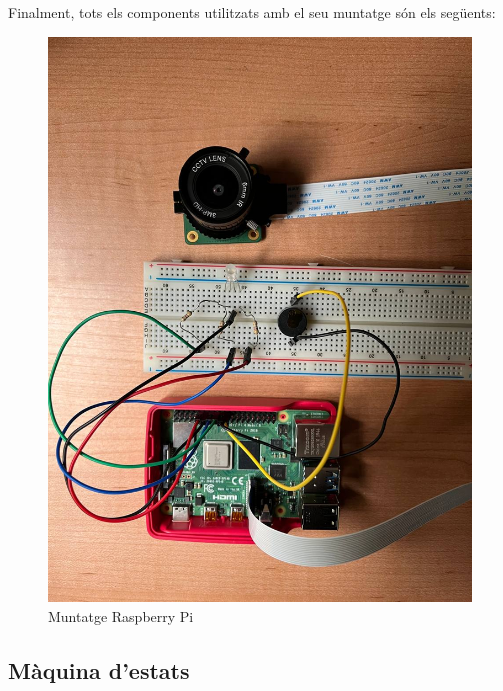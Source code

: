 Finalment, tots els components utilitzats amb el seu muntatge són els següents:

\begin{figure}[H]
    \begin{center}
        \includegraphics[scale=0.28]{Fotos/material.jpeg}
    \end{center}
    \caption{Muntatge Raspberry Pi}
    \label{fig:material}
\end{figure}


\subsection{Màquina d'estats}

